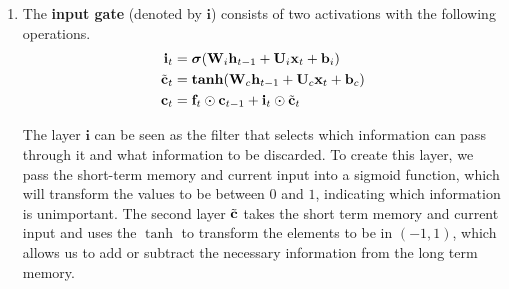 \documentclass{article}
\begin{document}
\begin{enumerate}
      \item The \textbf{input gate} (denoted by $\mathbf{i}$) consists of two activations with the following operations. 
      \begin{align}
          \mathbf{i}_t & = \boldsymbol{\sigma}( \mathbf{W}_i \mathbf{h}_{t-1} + \mathbf{U}_i \mathbf{x}_t + \mathbf{b}_i ) \\
          \Tilde{\mathbf{c}}_t & = \boldsymbol{\tanh}( \mathbf{W}_c \mathbf{h}_{t-1} + \mathbf{U}_c \mathbf{x}_t + \mathbf{b}_c ) \\ 
          \mathbf{c}_t & = \mathbf{f}_t \odot \mathbf{c}_{t-1} + \mathbf{i}_t \odot \Tilde{\mathbf{c}}_t 
      \end{align}

      The layer $\mathbf{i}$ can be seen as the filter that selects which information can pass through it and what information to be discarded. To create this layer, we pass the short-term memory and current input into a sigmoid function, which will transform the values to be between $0$ and $1$, indicating which information is unimportant. The second layer $\Tilde{\mathbf{c}}$ takes the short term memory and current input and uses the $\tanh$ to transform the elements to be in $(-1, 1)$, which allows us to add or subtract the necessary information from the long term memory. 


\end{enumerate}
\end{document}
